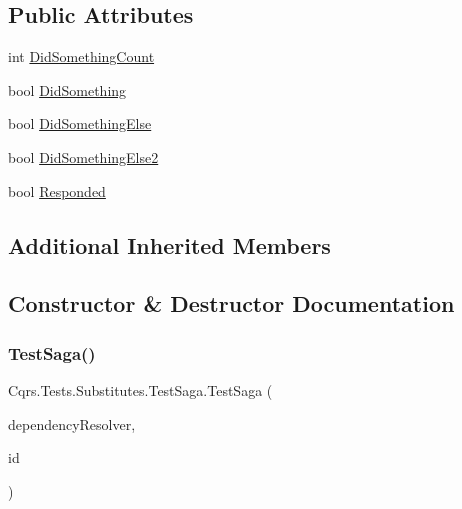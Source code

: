 \subsection*{Public Attributes}
\begin{DoxyCompactItemize}
\item 
int \hyperlink{classCqrs_1_1Tests_1_1Substitutes_1_1TestSaga_a8f2d9d216aeb1ffd3c8927a15c95f979_a8f2d9d216aeb1ffd3c8927a15c95f979}{Did\+Something\+Count}
\item 
bool \hyperlink{classCqrs_1_1Tests_1_1Substitutes_1_1TestSaga_aa906cfd8a91bf74c045932cced0c8da1_aa906cfd8a91bf74c045932cced0c8da1}{Did\+Something}
\item 
bool \hyperlink{classCqrs_1_1Tests_1_1Substitutes_1_1TestSaga_a1aebc769db5e0266c536a39788af8799_a1aebc769db5e0266c536a39788af8799}{Did\+Something\+Else}
\item 
bool \hyperlink{classCqrs_1_1Tests_1_1Substitutes_1_1TestSaga_a77af339011080566a45a2682a486cb3b_a77af339011080566a45a2682a486cb3b}{Did\+Something\+Else2}
\item 
bool \hyperlink{classCqrs_1_1Tests_1_1Substitutes_1_1TestSaga_a75ef0962453c0a012368cb524f745068_a75ef0962453c0a012368cb524f745068}{Responded}
\end{DoxyCompactItemize}
\subsection*{Additional Inherited Members}


\subsection{Constructor \& Destructor Documentation}
\mbox{\label{classCqrs_1_1Tests_1_1Substitutes_1_1TestSaga_add3c932a45b03e651a09bc0df79fa267_add3c932a45b03e651a09bc0df79fa267}} 
\subsubsection{\texorpdfstring{Test\+Saga()}{TestSaga()}}
{\footnotesize\ttfamily Cqrs.\+Tests.\+Substitutes.\+Test\+Saga.\+Test\+Saga (\begin{DoxyParamCaption}\item[{\hyperlink{interfaceCqrs_1_1Configuration_1_1IDependencyResolver}{I\+Dependency\+Resolver}}]{dependency\+Resolver,  }\item[{Guid}]{id }\end{DoxyParamCaption})}



